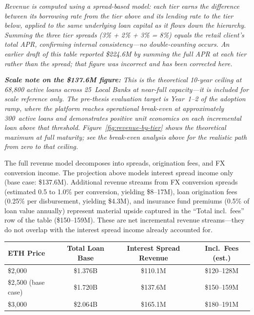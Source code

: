 \documentclass[12pt,a4paper]{report}
\newcommand{\tableheadcolor}{\rowcolor{TableHeadBg}}
\newcommand{\tableheadfont}{\bfseries}
\begin{document}
\vspace{2pt}
\noindent\textit{\small Revenue is computed using a \textit{spread-based} model: each tier earns the difference between its borrowing rate from the tier above and its lending rate to the tier below, applied to the same underlying loan capital as it flows down the hierarchy. Summing the three tier spreads (3\% + 2\% + 3\% = 8\%) equals the retail client's total APR, confirming internal consistency---no double-counting occurs. An earlier draft of this table reported \$224.6M by summing the full APR at each tier rather than the spread; that figure was incorrect and has been corrected here.}

\vspace{4pt}
\noindent\textit{\small \textbf{Scale note on the \$137.6M figure:} This is the theoretical 10-year ceiling at 68,800 active loans across 25~Local Banks at near-full capacity---it is included for scale reference only. The pre-thesis evaluation target is Year~1--2 of the adoption ramp, where the platform reaches operational break-even at approximately 300~active loans and demonstrates positive unit economics on each incremental loan above that threshold. Figure~\ref{fig:revenue-by-tier} shows the theoretical maximum at full maturity; see the break-even analysis above for the realistic path from zero to that ceiling.}

\vspace{4pt}
\noindent The full revenue model decomposes into spreads, origination fees, and FX conversion income. The projection above models interest spread income only (base case: \$137.6M). Additional revenue streams from FX conversion spreads (estimated 0.5 to 1.0\% per conversion, yielding \$8--17M), loan origination fees (0.25\% per disbursement, yielding \$4.3M), and insurance fund premiums (0.5\% of loan value annually) represent material upside captured in the ``Total incl.\ fees'' row of the table (\$150--159M). These are net incremental revenue streams---they do not overlap with the interest spread income already accounted for.

\begin{table}[H]
\centering
\begin{tabular}{@{}lccc@{}}
\toprule
\tableheadcolor
\tableheadfont ETH Price & \tableheadfont Total Loan Base & \tableheadfont Interest Spread Revenue & \tableheadfont Incl.\ Fees (est.) \\
\midrule
\$2{,}000 & \$1.376B & \$110.1M & \$120--128M \\
\rowcolor{RowShade}
\$2{,}500 (base case) & \$1.720B & \$137.6M & \$150--159M \\
\$3{,}000 & \$2.064B & \$165.1M & \$180--191M \\
\bottomrule
\end{tabular}
\end{table}
\end{document}
